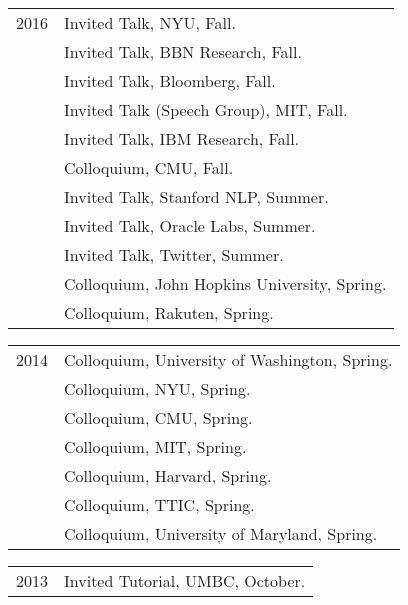 \documentclass[10pt]{article}
\begin{document}
{{{{\hspace{-1cm} \begin{tabular}{lp{11.5cm}}
	2016
	 & \ind   Invited Talk, NYU, Fall.                     \\
	 & \ind   Invited Talk, BBN Research, Fall.            \\
	 & \ind   Invited Talk, Bloomberg, Fall.               \\
	 & \ind   Invited Talk (Speech Group), MIT, Fall.      \\
	 & \ind   Invited Talk, IBM Research, Fall.            \\
	 & \ind   Colloquium, CMU, Fall.                       \\
	 & \ind   Invited Talk, Stanford NLP, Summer.          \\
	 & \ind   Invited Talk, Oracle Labs, Summer.           \\
	 & \ind   Invited Talk, Twitter, Summer.               \\
	 & \ind   Colloquium, John Hopkins University, Spring. \\
	 & \ind   Colloquium, Rakuten, Spring.                 \\
\end{tabular}
\begin{tabular}{lp{11.5cm}}

	2014

	 & \ind   Colloquium, University of Washington, Spring. \\

	 & \ind   Colloquium, NYU, Spring.                      \\

	 & \ind   Colloquium, CMU, Spring.                      \\

	 & \ind   Colloquium, MIT, Spring.                      \\

	 & \ind   Colloquium, Harvard, Spring.                  \\

	 & \ind   Colloquium, TTIC, Spring.                     \\

	 & \ind   Colloquium, University of Maryland, Spring.   \\
\end{tabular}
\hspace{-1cm} \begin{tabular}{lp{11.5cm}}
	2013
	     & \ind   Invited Tutorial, UMBC, October.                                                      \\


\end{tabular}}}}}
\end{document}
